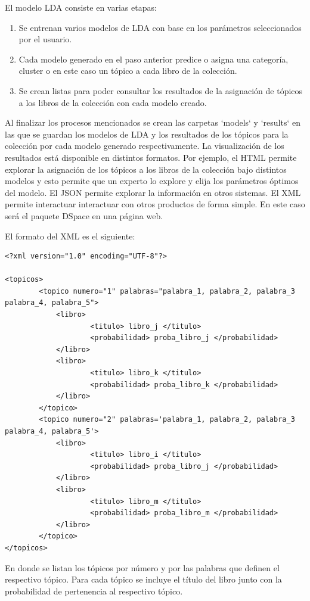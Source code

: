 El modelo LDA consiste en varias etapas:
\begin{enumerate}
\item Se entrenan varios modelos de LDA con base en los parámetros seleccionados por el usuario.
\item Cada modelo generado en el paso anterior predice o asigna una categoría, cluster o en este caso un tópico a cada libro de la colección.
\item  Se crean listas para poder consultar los resultados de la asignación de tópicos a los libros de la colección con cada modelo creado.
\end{enumerate}

Al finalizar los procesos mencionados se crean las carpetas `models` y `results` en las que se guardan los modelos de LDA y los resultados de los tópicos para la colección por cada modelo generado respectivamente. La visualización de los resultados está disponible en distintos formatos. Por ejemplo, el HTML permite explorar la asignación de los tópicos a los libros de la colección bajo distintos modelos y esto permite que un experto lo explore y elija los parámetros óptimos del modelo. El JSON permite explorar la información en otros sistemas. El XML permite interactuar interactuar con otros productos de forma simple. En este caso será el paquete DSpace en una página web.

El formato del XML es el siguiente:

\begin{lstlisting}
<?xml version="1.0" encoding="UTF-8"?>

<topicos>
		<topico numero="1" palabras="palabra_1, palabra_2, palabra_3 palabra_4, palabra_5">
			<libro>
					<titulo> libro_j </titulo>
					<probabilidad> proba_libro_j </probabilidad>
			</libro>
			<libro>
					<titulo> libro_k </titulo>
					<probabilidad> proba_libro_k </probabilidad>
			</libro>
		</topico>
		<topico numero="2" palabras='palabra_1, palabra_2, palabra_3 palabra_4, palabra_5'>
			<libro>
					<titulo> libro_i </titulo>
					<probabilidad> proba_libro_j </probabilidad>
			</libro>
			<libro>
					<titulo> libro_m </titulo>
					<probabilidad> proba_libro_m </probabilidad>
			</libro>
		</topico>
</topicos>
\end{lstlisting}

En donde se listan los tópicos por número y por las palabras que definen el respectivo tópico. Para cada tópico se incluye el título del libro junto con la probabilidad de pertenencia al respectivo tópico.


